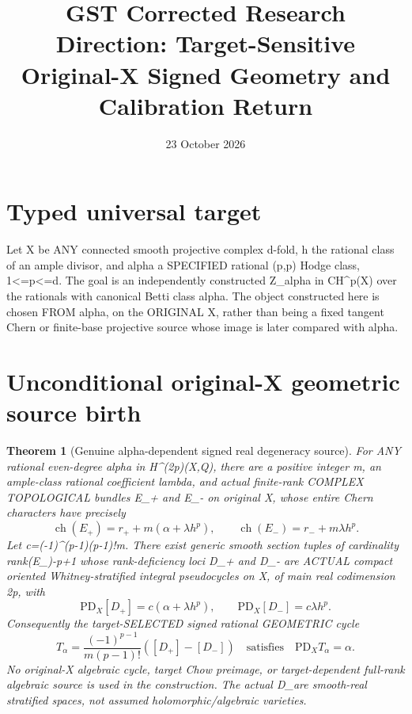 \documentclass[11pt]{article}
\title{GST Corrected Research Direction: Target-Sensitive Original-X Signed Geometry and Calibration Return}
\date{23 October 2026}
\newtheorem{theorem}{Theorem}
\begin{document}
\maketitle
\section{Typed universal target}
Let X be ANY connected smooth projective complex d-fold,
h the rational class of an ample divisor, and
alpha a SPECIFIED rational (p,p) Hodge class, 1<=p<=d.
The goal is an independently constructed
Z_alpha in CH^p(X) over the rationals with
canonical Betti class alpha.
The object constructed here is chosen FROM alpha, on
the ORIGINAL X, rather than being a fixed tangent Chern
or finite-base projective source whose image is later
compared with alpha.

\section{Unconditional original-X geometric source birth}
\begin{theorem}[Genuine alpha-dependent signed real degeneracy source]
For ANY rational even-degree alpha in H^(2p)(X,Q),
there are a positive integer m, an ample-class
rational coefficient lambda, and actual finite-rank
COMPLEX TOPOLOGICAL bundles E_+ and E_- on original X,
whose entire Chern characters have precisely
\[
 \operatorname{ch}(E_+)=r_++m(\alpha+\lambda h^p),
 \qquad
 \operatorname{ch}(E_-)=r_-+m\lambda h^p.       \tag{1}
\]
Let c=(-1)^(p-1)(p-1)!m.
There exist generic smooth section tuples
of cardinality rank(E_\pm)-p+1 whose rank-deficiency
loci D_+ and D_- are ACTUAL compact oriented
Whitney-stratified integral pseudocycles on X,
of main real codimension 2p, with
\[
 \mathrm{PD}_X[D_+]=c(\alpha+\lambda h^p),
 \qquad
 \mathrm{PD}_X[D_-]=c\lambda h^p.               \tag{2}
\]
Consequently the target-SELECTED signed rational
GEOMETRIC cycle
\[
 T_\alpha=\frac{(-1)^{p-1}}{m(p-1)!}
                   ([D_+]-[D_-])
\quad\text{satisfies}\quad
 \boxed{\mathrm{PD}_X T_\alpha=\alpha.}         \tag{3}
\]
No original-X algebraic cycle, target Chow preimage,
or target-dependent full-rank algebraic source is
used in the construction. The actual D_\pm are
smooth-real stratified spaces, not assumed
holomorphic/algebraic varieties.
\end{theorem}
\end{document}
